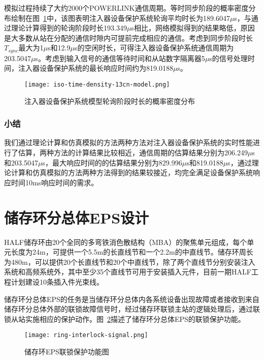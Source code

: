 模拟过程持续了大约2000个POWERLINK通信周期。等时同步阶段的概率密度分布绘制在图~\ref{fig:iso-time-density-13cn-model}中，该图表明注入器设备保护系统轮询平均时长为189.6047$\mu$s，与通过理论计算得到的轮询阶段时长193.349$\mu$s相比，网络模拟得到的结果略低，原因是大多数从站在分配的通信时隙内可提前完成相应的通信。考虑到同步阶段时长$T_{sync}$最大为1$\mu$s和12.9$\mu$s的空闲时长，可得注入器设备保护系统通信周期为203.5047$\mu$s。考虑到输入信号的通信等待时间和从站数字隔离器5$\mu$s的信号处理时间，注入器设备保护系统的最长响应时间约为819.0188$\mu$s。

\begin{figure}[!htb]
  \centering
  \texttt{[image: iso-time-density-13cn-model.png]}
  \caption{注入器设备保护系统模型轮询阶段时长的概率密度分布}
  \label{fig:iso-time-density-13cn-model}
\end{figure}

\subsubsection{小结}

我们通过理论计算和仿真模拟的方法两种方法对注入器设备保护系统的实时性能进行了估算，两种方法的计算结果比较相近，通信周期的估算结果分别为206.249$\mu$s和203.5047$\mu$s，最大响应时间的的估算结果分别为829.996$\mu$s和819.0188$\mu$s，通过理论计算和仿真模拟的方法两种方法得到的结果较接近，均完全满足设备保护系统响应时间10ms响应时间的需求。



\section{储存环分总体EPS设计}

HALF储存环由20个全同的多弯铁消色散结构（MBA）的聚焦单元组成，每个单元长度为24m，可提供一个5.5m的长直线节和一个2.2m的中直线节。储存环周长为480m，可以提供20个长直线节和20个中直线节，除了两个直线节分别安装注入系统和高频系统外，其中至少35个直线节可用于安装插入元件，目前一期HALF工程计划建设10条插入件光束线。

储存环分总体EPS的任务是当储存环分总体内各系统设备出现故障或者接收到来自储存环分总体外部的联锁故障信号时，经过储存环联锁主站的逻辑处理后，通过联锁从站实施相应的保护动作。图~\ref{fig:ring-interlock-signal}描述了储存环分总体EPS的联锁保护功能。

\begin{figure}[!htb]
	\centering
	\texttt{[image: ring-interlock-signal.png]}
	\caption{储存环EPS联锁保护功能图}
	\label{fig:ring-interlock-signal}
\end{figure}

